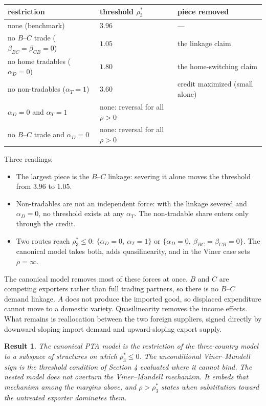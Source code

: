 \documentclass[11pt]{article}
\newtheorem{result}{Result}[section]
\begin{document}
\begin{center}
\begin{tabular}{lll}
\toprule
restriction & threshold $\rho_3^*$ & piece removed \\
\midrule
none (benchmark) & $3.96$ & --- \\
no $B$--$C$ trade ($\beta_{BC} = \beta_{CB} = 0$) & $1.05$ & the linkage claim \\
no home tradables ($\alpha_D = 0$) & $1.80$ & the home-switching claim \\
no non-tradables ($\alpha_T = 1$) & $3.60$ & credit maximized (small alone) \\
$\alpha_D = 0$ and $\alpha_T = 1$ & none: reversal for all $\rho > 0$ & \\
no $B$--$C$ trade and $\alpha_D = 0$ & none: reversal for all $\rho > 0$ & \\
\bottomrule
\end{tabular}
\end{center}

Three readings:
\begin{itemize}
\item The largest piece is the $B$--$C$ linkage: severing it alone moves the threshold from $3.96$ to $1.05$.
\item Non-tradables are not an independent force: with the linkage severed and $\alpha_D = 0$, no threshold exists at any $\alpha_T$. The non-tradable share enters only through the credit.
\item Two routes reach $\rho_3^* \leq 0$: $\{\alpha_D = 0,\ \alpha_T = 1\}$ or $\{\alpha_D = 0,\ \beta_{BC} = \beta_{CB} = 0\}$. The canonical model takes both, adds quasilinearity, and in the Viner case sets $\rho = \infty$.
\end{itemize}

The canonical model removes most of these forces at once. $B$ and $C$ are competing exporters rather than full trading partners, so there is no $B$--$C$ demand linkage. $A$ does not produce the imported good, so displaced expenditure cannot move to a domestic variety. Quasilinearity removes the income effects. What remains is reallocation between the two foreign suppliers, signed directly by downward-sloping import demand and upward-sloping export supply.

\begin{result}
The canonical PTA model is the restriction of the three-country model to a subspace of structures on which $\rho_3^* \leq 0$. The unconditional Viner--Mundell sign is the threshold condition of Section 4 evaluated where it cannot bind. The nested model does not overturn the Viner--Mundell mechanism. It embeds that mechanism among the margins above, and $\rho > \rho_3^*$ states when substitution toward the untreated exporter dominates them.
\end{result}
\end{document}

